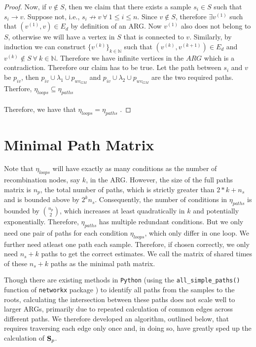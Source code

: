 \begin{proof}
Now, if $v \notin S$, then we claim that there exists a sample $s_i \in S$ such that $s_i \rightarrow v$. Suppose not, i.e., $s_i \nrightarrow v \ \forall \ 1 \leq i \leq n $. Since $v \notin S$, therefore $\exists v^{(1)}$ such that $(v^{(1)},v) \in E_d$ by definition of an ARG. Now $v^{(1)}$ also does not belong to $S$, otherwise we will have a vertex in $S$ that is connected to $v$. Similarly, by induction we can construct $\{ v^{(k)} \}_{k \in \mathbb{N}}$ such that $(v^{(k)},v^{(k+1)}) \in E_d$ and $v^{(k)} \notin S \ \forall \ k \in \mathbb{N}$.  Therefore we have infinite vertices in the $ARG$ which is a contradiction. Therefore our claim has to be true. Let the path between $s_i$ and $v$ be $p_{iv}$, then $p_{iv} \cup \lambda_1 \cup p_{wv_{GM}}$ and $p_{iv} \cup \lambda_2 \cup p_{wv_{GM}}$ are the two required paths. Therfore, $\eta_{loops} \subseteq \eta_{paths}$ \\ \\ 
Therefore, we have that $\eta_{loops} = \eta_{paths}$ .
\end{proof}

\section{Minimal Path Matrix}
\label{appendixC:description}
Note that $\eta_{loops}$ will have exactly as many conditions as the number of recombination nodes, say $k$, in the ARG. However, the size of the full paths matrix is $n_p$, the total number of paths, which is strictly greater than $2*k + n_s$ and is bounded above by $2^k n_s$. Consequently, the number of conditions in $\eta_{paths}$ is bounded by $\displaystyle \binom{n_p}{2}$, which increases at least quadratically in $k$ and potentially exponentially. Therefore, $\eta_{paths}$ has multiple redundant conditions. But we only need one pair of paths for each condition $\eta_{loops}$, which only differ in one loop. We further need atleast one path each sample. Therefore, if chosen correctly, we only need $n_s + k$ paths to get the correct estimates. We call the matrix of shared times of these $n_s + k$ paths as the minimal path matrix.

Though there are existing methods in {\tt Python} (using the {\tt all\_simple\_paths()} function of {\tt networkx} package ) to identify all paths from the samples to the roots, calculating the intersection between these paths does not scale well to larger ARGs, primarily due to repeated calculation of common edges across different paths. We therefore developed an algorithm, outlined below, that requires traversing each edge only once and, in doing so, have greatly sped up the calculation of $\mathbf{S}_p$. 

